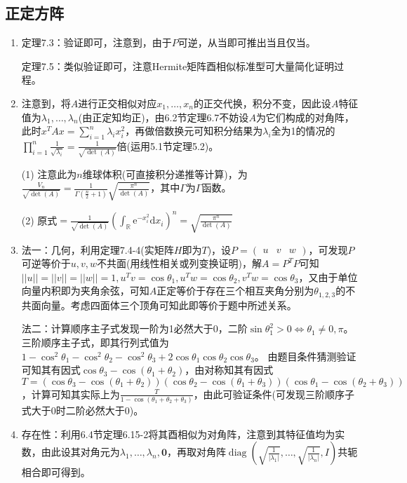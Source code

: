 \documentclass[a4paper,UTF8,fontset=windows]{ctexart}
\DeclareMathOperator{\diag}{diag}
\begin{document}
\subsection{正定方阵}
\begin{enumerate}
\item
定理7.3：验证即可，注意到，由于$P$可逆，从当即可推出当且仅当。

定理7.5：类似验证即可，注意Hermite矩阵酉相似标准型可大量简化证明过程。

\item
注意到，将$A$进行正交相似对应$x_1,\ldots,x_n$的正交代换，积分不变，因此设$A$特征值为$\lambda_1,\ldots,\lambda_n$(由正定知均正)，由6.2节定理6.7不妨设$A$为它们构成的对角阵，此时$x^TAx=\sum_{i=1}^{n}\lambda_ix_i^2$，再做倍数换元可知积分结果为$\lambda_i$全为1的情况的$\prod_{i=1}^{n}\frac{1}{\sqrt{\lambda_i}}=\frac{1}{\sqrt{\det(A)}}$倍(运用5.1节定理5.2)。

(1) 注意此为$n$维球体积(可直接积分递推等计算)，为$\frac{V_n}{\sqrt{\det(A)}}=\frac{1}{\Gamma\left(\frac{n}{2}+1\right)}\sqrt{\frac{\pi^n}{\det(A)}}$，其中$\Gamma$为$\Gamma$函数。

(2) 原式$=\frac{1}{\sqrt{\det(A)}}\left(\int_{\mathbb{R}}\mathrm{e}^{-x_i^2}\mathrm{d}x_i\right)^n=\sqrt{\frac{\pi^n}{\det(A)}}$

\item
法一：几何，利用定理7.4-4(实矩阵$H$即为$T$)，设$P=\begin{pmatrix}u&v&w\end{pmatrix}$，可发现$P$可逆等价于$u,v,w$不共面(用线性相关或列变换证明)，解$A=P^TP$可知$||u||=||v||=||w||=1,u^Tv=\cos\theta_1,u^Tw=\cos\theta_2,v^Tw=\cos\theta_3$，又由于单位向量内积即为夹角余弦，可知$A$正定等价于存在三个相互夹角分别为$\theta_{1,2,3}$的不共面向量。考虑四面体三个顶角可知此即等价于题中所述关系。

法二：计算顺序主子式发现一阶为1必然大于0，二阶$\sin\theta_1^2>0\Leftrightarrow\theta_1\ne0,\pi$。三阶顺序主子式，即其行列式值为$1-\cos^2\theta_1-\cos^2\theta_2-\cos^2\theta_3+2\cos\theta_1\cos\theta_2\cos\theta_3$。
由题目条件猜测验证可知其有因式$\cos\theta_3-\cos(\theta_1+\theta_2)$，由对称知其有因式$T=(\cos\theta_3-\cos(\theta_1+\theta_2))(\cos\theta_2-\cos(\theta_1+\theta_3))(\cos{\theta_1}-\cos(\theta_2+\theta_3))$，计算可知其实际上为$\frac{T}{1-\cos(\theta_1+\theta_2+\theta_3)}$，由此可验证条件(可发现三阶顺序子式大于0时二阶必然大于0)。

\item
存在性：利用6.4节定理6.15-2将其酉相似为对角阵，注意到其特征值均为实数，由此设其对角元为$\lambda_1,\ldots,\lambda_n,\mathbf{0}$，再取对角阵$\diag\left(\sqrt{\frac{1}{|\lambda_1|}},\ldots,\sqrt{\frac{1}{|\lambda_n|}},I\right)$共轭相合即可得到。


\end{enumerate}
\end{document}
